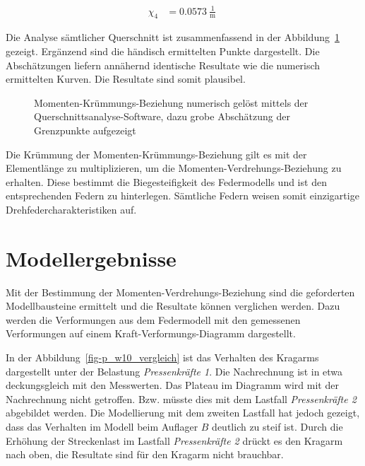 \documentclass[
  11pt,
  letterpaper,
]{scrreprt}
\begin{document}
$$
\begin{aligned}
\chi_{4} &= 0.0573\ \frac{1}{\mathrm{m}} \;
\end{aligned}
$$

Die Analyse sämtlicher Querschnitt ist zusammenfassend in der
Abbildung~\ref{fig-m_chi_schaetzung} gezeigt. Ergänzend sind die
händisch ermittelten Punkte dargestellt. Die Abschätzungen liefern
annähernd identische Resultate wie die numerisch ermittelten Kurven. Die
Resultate sind somit plausibel.

\begin{figure}[H]


\caption{\label{fig-m_chi_schaetzung}Momenten-Krümmungs-Beziehung
numerisch gelöst mittels der Querschnittsanalyse-Software, dazu grobe
Abschätzung der Grenzpunkte aufgezeigt}

\end{figure}%

Die Krümmung der Momenten-Krümmungs-Beziehung gilt es mit der
Elementlänge zu multiplizieren, um die Momenten-Verdrehungs-Beziehung zu
erhalten. Diese bestimmt die Biegesteifigkeit des Federmodells und ist
den entsprechenden Federn zu hinterlegen. Sämtliche Federn weisen somit
einzigartige Drehfedercharakteristiken auf.

\section{Modellergebnisse}\label{modellergebnisse-2}

Mit der Bestimmung der Momenten-Verdrehungs-Beziehung sind die
geforderten Modellbausteine ermittelt und die Resultate können
verglichen werden. Dazu werden die Verformungen aus dem Federmodell mit
den gemessenen Verformungen auf einem Kraft-Verformungs-Diagramm
dargestellt.

In der Abbildung~\ref{fig-p_w10_vergleich} ist das Verhalten des
Kragarms dargestellt unter der Belastung \emph{Pressenkräfte 1}. Die
Nachrechnung ist in etwa deckungsgleich mit den Messwerten. Das Plateau
im Diagramm wird mit der Nachrechnung nicht getroffen. Bzw. müsste dies
mit dem Lastfall \emph{Pressenkräfte 2} abgebildet werden. Die
Modellierung mit dem zweiten Lastfall hat jedoch gezeigt, dass das
Verhalten im Modell beim Auflager \(B\) deutlich zu steif ist. Durch die
Erhöhung der Streckenlast im Lastfall \emph{Pressenkräfte 2} drückt es
den Kragarm nach oben, die Resultate sind für den Kragarm nicht
brauchbar.
\end{document}
